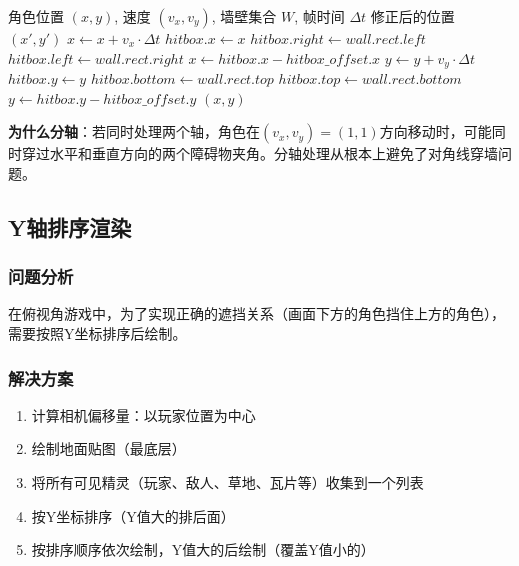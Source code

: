 \documentclass[12pt,a4paper]{article}
\begin{document}
\begin{algorithm}[htbp]
\caption{分轴碰撞检测}
\begin{algorithmic}[1]
\Require 角色位置 $(x, y)$, 速度 $(v_x, v_y)$, 墙壁集合 $W$, 帧时间 $\Delta t$
\Ensure 修正后的位置 $(x', y')$
\State $x \leftarrow x + v_x \cdot \Delta t$ 
\State $hitbox.x \leftarrow x$ 
         
            \State $hitbox.right \leftarrow wall.rect.left$
         
            \State $hitbox.left \leftarrow wall.rect.right$
        \EndIf
    \EndIf
\EndFor
\State $x \leftarrow hitbox.x - hitbox\_offset.x$ 
\State $y \leftarrow y + v_y \cdot \Delta t$ 
\State $hitbox.y \leftarrow y$ 
         
            \State $hitbox.bottom \leftarrow wall.rect.top$
         
            \State $hitbox.top \leftarrow wall.rect.bottom$
        \EndIf
    \EndIf
\EndFor
\State $y \leftarrow hitbox.y - hitbox\_offset.y$ 
\State \Return $(x, y)$
\end{algorithmic}
\end{algorithm}

\textbf{为什么分轴}：若同时处理两个轴，角色在$(v_x, v_y) = (1, 1)$方向移动时，可能同时穿过水平和垂直方向的两个障碍物夹角。分轴处理从根本上避免了对角线穿墙问题。

\subsection{Y轴排序渲染}

\subsubsection{问题分析}

在俯视角游戏中，为了实现正确的遮挡关系（画面下方的角色挡住上方的角色），需要按照Y坐标排序后绘制。

\subsubsection{解决方案}

\begin{enumerate}[leftmargin=2em]
    \item 计算相机偏移量：以玩家位置为中心
    \item 绘制地面贴图（最底层）
    \item 将所有可见精灵（玩家、敌人、草地、瓦片等）收集到一个列表
    \item 按Y坐标排序（Y值大的排后面）
    \item 按排序顺序依次绘制，Y值大的后绘制（覆盖Y值小的）
\end{enumerate}
\end{document}
